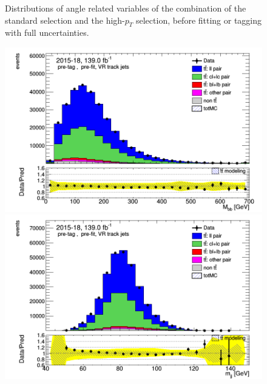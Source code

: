 \documentclass[letterpaper,12pt]{article}
\begin{document}
\begin{figure}
\begin{minipage}[b]{.45\textwidth}
	\end{minipage}
	\caption{Distributions of angle related variables of the combination 
	of the standard selection and the high-$p_T$ 
	selection, before fitting or tagging with full uncertainties.} \label{fig:angles_VRJets}
	\end{figure}
	
	
	\begin{figure}
	\begin{minipage}[b]{.45\textwidth}
	\centering
	\includegraphics[width=1\textwidth]{Oct_distributions/pretagNoRwDL1rwithhighpTVRJets_scaledall/DataMC_Mbb.png}
	\end{minipage}\hfill
	\begin{minipage}[b]{.45\textwidth}
	\centering
	\includegraphics[width=1\textwidth]{Oct_distributions/pretagNoRwDL1rwithhighpTVRJets_scaledall/DataMC_mjj.png}
	\end{minipage}
	\begin{minipage}[b]{.45\textwidth}

\end{minipage}
\end{figure}
\end{document}

